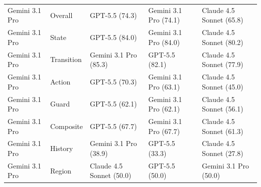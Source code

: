 \begin{table}[t]
\begin{tabular}{lllll}
Gemini 3.1 Pro & Overall & GPT-5.5 (74.3) & Gemini 3.1 Pro (74.1) & Claude 4.5 Sonnet (65.8) \\
Gemini 3.1 Pro & State & GPT-5.5 (84.0) & Gemini 3.1 Pro (84.0) & Claude 4.5 Sonnet (80.2) \\
Gemini 3.1 Pro & Transition & Gemini 3.1 Pro (85.3) & GPT-5.5 (82.1) & Claude 4.5 Sonnet (77.9) \\
Gemini 3.1 Pro & Action & GPT-5.5 (70.3) & Gemini 3.1 Pro (63.1) & Claude 4.5 Sonnet (45.0) \\
Gemini 3.1 Pro & Guard & GPT-5.5 (62.1) & Gemini 3.1 Pro (62.1) & Claude 4.5 Sonnet (56.1) \\
Gemini 3.1 Pro & Composite & GPT-5.5 (67.7) & Gemini 3.1 Pro (67.7) & Claude 4.5 Sonnet (61.3) \\
Gemini 3.1 Pro & History & Gemini 3.1 Pro (38.9) & GPT-5.5 (33.3) & Claude 4.5 Sonnet (27.8) \\
Gemini 3.1 Pro & Region & Claude 4.5 Sonnet (50.0) & GPT-5.5 (50.0) & Gemini 3.1 Pro (50.0) \\
\bottomrule
\end{tabular}
\end{table}
